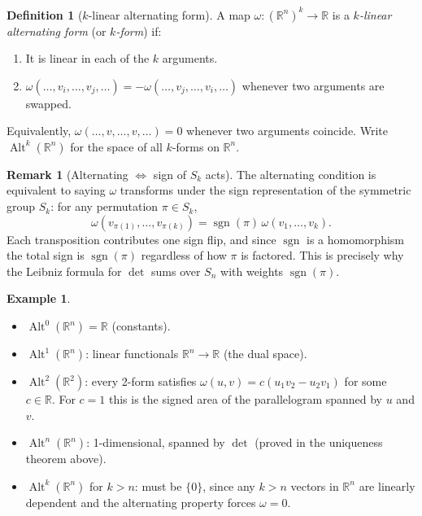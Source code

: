 \documentclass[11pt]{article}
\theoremstyle{definition}
\newtheorem{definition}{Definition}[section]
\newtheorem{example}{Example}[section]
\newtheorem{remark}{Remark}[section]
\theoremstyle{plain}
\begin{document}
\begin{definition}[$k$-linear alternating form]
  A map $\omega: (\mathbb{R}^n)^k \to \mathbb{R}$ is a
  \emph{$k$-linear alternating form} (or \emph{$k$-form}) if:
  \begin{enumerate}
    \item It is linear in each of the $k$ arguments.
    \item $\omega(\ldots,v_i,\ldots,v_j,\ldots) =
          -\omega(\ldots,v_j,\ldots,v_i,\ldots)$
          whenever two arguments are swapped.
  \end{enumerate}
  Equivalently, $\omega(\ldots,v,\ldots,v,\ldots) = 0$ whenever two
  arguments coincide.  Write $\operatorname{Alt}^k(\mathbb{R}^n)$ for
  the space of all $k$-forms on $\mathbb{R}^n$.
\end{definition}

\begin{remark}[Alternating $\Leftrightarrow$ sign of $S_k$ acts]
  The alternating condition is equivalent to saying $\omega$ transforms
  under the sign representation of the symmetric group $S_k$: for any
  permutation $\pi\in S_k$,
  \[
    \omega(v_{\pi(1)},\ldots,v_{\pi(k)})
    = \operatorname{sgn}(\pi)\,\omega(v_1,\ldots,v_k).
  \]
  Each transposition contributes one sign flip, and since
  $\operatorname{sgn}$ is a homomorphism the total sign is
  $\operatorname{sgn}(\pi)$ regardless of how $\pi$ is factored.
  This is precisely why the Leibniz formula for $\det$ sums over $S_n$
  with weights $\operatorname{sgn}(\pi)$.
\end{remark}

\begin{example}
  \leavevmode
  \begin{itemize}
    \item $\operatorname{Alt}^0(\mathbb{R}^n) = \mathbb{R}$ (constants).
    \item $\operatorname{Alt}^1(\mathbb{R}^n)$: linear functionals
          $\mathbb{R}^n\to\mathbb{R}$ (the dual space).
    \item $\operatorname{Alt}^2(\mathbb{R}^2)$: every 2-form satisfies
          $\omega(u,v) = c(u_1v_2-u_2v_1)$ for some $c\in\mathbb{R}$.
          For $c=1$ this is the signed area of the parallelogram spanned
          by $u$ and $v$.
    \item $\operatorname{Alt}^n(\mathbb{R}^n)$: 1-dimensional, spanned by
          $\det$ (proved in the uniqueness theorem above).
    \item $\operatorname{Alt}^k(\mathbb{R}^n)$ for $k>n$: must be $\{0\}$,
          since any $k>n$ vectors in $\mathbb{R}^n$ are linearly dependent
          and the alternating property forces $\omega=0$.
  \end{itemize}
\end{example}
\end{document}
